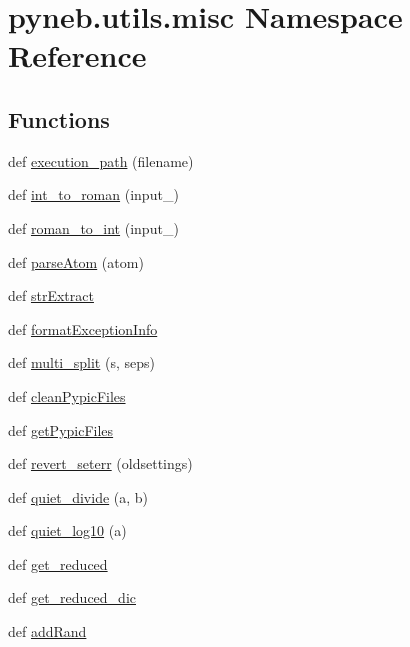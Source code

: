 \hypertarget{namespacepyneb_1_1utils_1_1misc}{}\section{pyneb.\+utils.\+misc Namespace Reference}
\label{namespacepyneb_1_1utils_1_1misc}
\subsection*{Functions}
\begin{DoxyCompactItemize}
\item 
def \hyperlink{namespacepyneb_1_1utils_1_1misc_a0e9572755930aabb03c6b0e5d66b8356}{execution\+\_\+path} (filename)
\item 
def \hyperlink{namespacepyneb_1_1utils_1_1misc_aec4e973d4cb9299f749ef190ea636a06}{int\+\_\+to\+\_\+roman} (input\+\_\+)
\item 
def \hyperlink{namespacepyneb_1_1utils_1_1misc_a97329c3ce57bd870421672b90e3e6541}{roman\+\_\+to\+\_\+int} (input\+\_\+)
\item 
def \hyperlink{namespacepyneb_1_1utils_1_1misc_a8c069186002a3e73dd474958e35034d5}{parse\+Atom} (atom)
\item 
def \hyperlink{namespacepyneb_1_1utils_1_1misc_aaf9c5249e3c3104e38854ca30f9df4b7}{str\+Extract}
\item 
def \hyperlink{namespacepyneb_1_1utils_1_1misc_ab2eb7efdb086136e683e7f05f17958a9}{format\+Exception\+Info}
\item 
def \hyperlink{namespacepyneb_1_1utils_1_1misc_a4fc4f061f0c41f29de52ec765f894faf}{multi\+\_\+split} (s, seps)
\item 
def \hyperlink{namespacepyneb_1_1utils_1_1misc_a71fea98dc66e2a1793b5c86a345da052}{clean\+Pypic\+Files}
\item 
def \hyperlink{namespacepyneb_1_1utils_1_1misc_aee812eafa08b828b4c65c700a6cf4ff6}{get\+Pypic\+Files}
\item 
def \hyperlink{namespacepyneb_1_1utils_1_1misc_adadbbcc030d1e6da419e5c7af03f5a2d}{revert\+\_\+seterr} (oldsettings)
\item 
def \hyperlink{namespacepyneb_1_1utils_1_1misc_afa4163f24be7b1472200c24824c72ae1}{quiet\+\_\+divide} (a, b)
\item 
def \hyperlink{namespacepyneb_1_1utils_1_1misc_ad7f2bfdb7125df3d6a57156deb181179}{quiet\+\_\+log10} (a)
\item 
def \hyperlink{namespacepyneb_1_1utils_1_1misc_ae69de9c9e8f8bde114b8edd326f3b993}{get\+\_\+reduced}
\item 
def \hyperlink{namespacepyneb_1_1utils_1_1misc_ad6fc4e32ea4c076ac81e99b5c1e74f13}{get\+\_\+reduced\+\_\+dic}
\item 
def \hyperlink{namespacepyneb_1_1utils_1_1misc_af39dcb3c2627e5f29063e47ca4327f94}{add\+Rand}
\end{DoxyCompactItemize}


